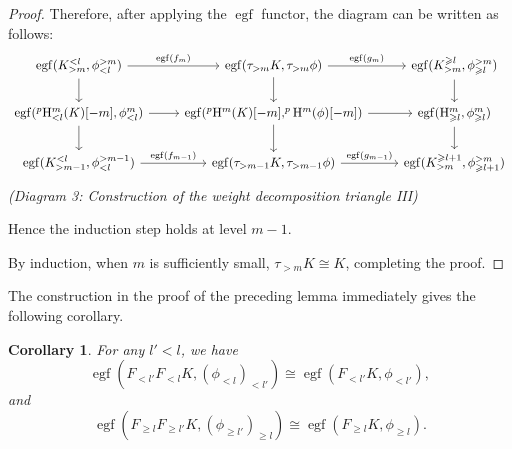 \documentclass[10pt,a4paper]{amsart}
\newtheorem{corollary}[theorem]{Corollary}
\begin{document}
\begin{proof}
Therefore, after applying the $\operatorname{egf}$ functor, the diagram can be written as follows:
\[
\begin{tikzcd}
\operatorname{egf}(K_{>m}^{<l},\phi^{>m}_{<l}) \arrow[r, "\operatorname{egf}(f_m)"] \arrow[d] & \operatorname{egf}(\tau_{>m}K,\tau_{>m}\phi) \arrow[r, "\operatorname{egf}(g_m)"] \arrow[d] & \operatorname{egf}(K_{>m}^{\geq l},\phi^{>m}_{\geq l}) \arrow[d] \\
\operatorname{egf}(^{p}\mathrm{H}^m_{<l}(K)[-m],\phi_{<l}^m) \arrow[r] \arrow[d] & \operatorname{egf}(^{p}\mathrm{H}^m(K)[-m], ^{p}\mathrm{H}^m(\phi)[-m]) \arrow[d] \arrow[r] & \operatorname{egf}(\mathrm{H}^m_{\geq l},\phi^m_{\geq l}) \arrow[d] \\
\operatorname{egf}(K_{>m-1}^{<l},\phi^{>m-1}_{<l}) \arrow[r, "\operatorname{egf}(f_{m-1})"] & \operatorname{egf}(\tau_{>m-1}K,\tau_{>m-1}\phi) \arrow[r, "\operatorname{egf}(g_{m-1})"] & \operatorname{egf}(K_{>m}^{\geq l+1},\phi^{>m}_{\geq l+1})
\end{tikzcd}
\]
\emph{(Diagram 3: Construction of the weight decomposition triangle III)}

Hence the induction step holds at level $m-1$.

By induction, when $m$ is sufficiently small, $\tau_{>m}K \cong K$, completing the proof.
\end{proof}
The construction in the proof of the preceding lemma immediately gives the following corollary.

\begin{corollary}\label{corll}
For any $l' < l$, we have
\[
\operatorname{egf}(F_{<l'} F_{<l} K, (\phi_{<l})_{<l'}) \cong \operatorname{egf}(F_{<l'} K, \phi_{<l'}),
\]
and
\[
\operatorname{egf}(F_{\geq l} F_{\geq l'} K, (\phi_{\geq l'})_{\geq l}) \cong \operatorname{egf}(F_{\geq l} K, \phi_{\geq l}).
\]
\end{corollary}
\end{document}
